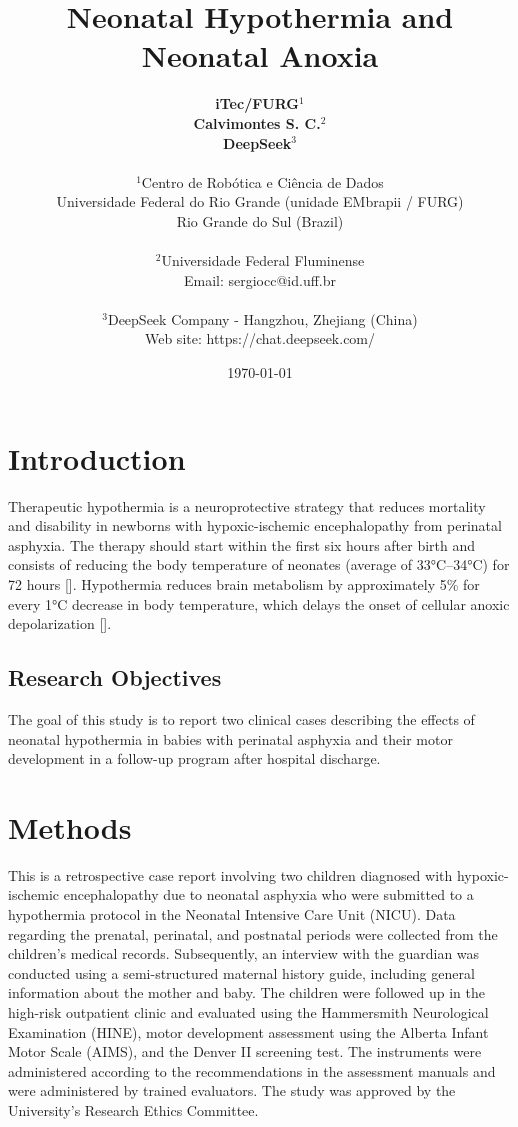 \documentclass[11pt,a4paper]{article}
\title{\textbf{Neonatal Hypothermia and Neonatal Anoxia}}
\author{
	\textbf{iTec/FURG}$^{1}$ \\
	\textbf{Calvimontes S. C.}$^{2}$ \\
	\textbf{DeepSeek}$^{3}$ \\
	\\
	\small $^{1}$Centro de Robótica e Ciência de Dados \\
	\small Universidade Federal do Rio Grande (unidade EMbrapii / FURG) \\
	\small Rio Grande do Sul (Brazil) \\
	\\
	\small $^{2}$Universidade Federal Fluminense \\
	\small Email: sergiocc@id.uff.br \\
	\\
	\small $^{3}$DeepSeek Company - Hangzhou, Zhejiang (China) \\
	\small Web site: https://chat.deepseek.com/
}
\date{\today}
\begin{document}
	
	\maketitle
	
	\newpage
	
	\section{Introduction}
	Therapeutic hypothermia is a neuroprotective strategy that reduces mortality and disability in newborns with hypoxic-ischemic encephalopathy from perinatal asphyxia. The therapy should start within the first six hours after birth and consists of reducing the body temperature of neonates (average of 33°C--34°C) for 72 hours [\cite{Azzopardi2014,Thayyil2021,Abate2021}]. Hypothermia reduces brain metabolism by approximately 5\% for every 1°C decrease in body temperature, which delays the onset of cellular anoxic depolarization [\cite{Silveira2015}].
		
	\subsection{Research Objectives}
	The goal of this study is to report two clinical cases describing the effects of neonatal hypothermia in babies with perinatal asphyxia and their motor development in a follow-up program after hospital discharge.
	
	\section{Methods}
	This is a retrospective case report involving two children diagnosed with hypoxic-ischemic encephalopathy due to neonatal asphyxia who were submitted to a hypothermia protocol in the Neonatal Intensive Care Unit (NICU). Data regarding the prenatal, perinatal, and postnatal periods were collected from the children's medical records. Subsequently, an interview with the guardian was conducted using a semi-structured maternal history guide, including general information about the mother and baby. The children were followed up in the high-risk outpatient clinic and evaluated using the Hammersmith Neurological Examination (HINE), motor development assessment using the Alberta Infant Motor Scale (AIMS), and the Denver II screening test. The instruments were administered according to the recommendations in the assessment manuals and were administered by trained evaluators. The study was approved by the University's Research Ethics Committee.
	
\end{document}

